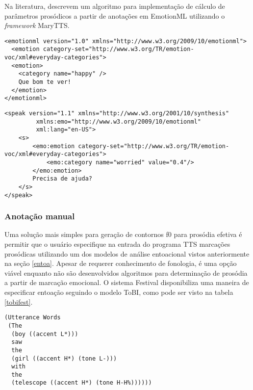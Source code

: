 Na literatura,  descrevem um algoritmo para implementação de
cálculo de parâmetros prosódicos a partir de anotações em EmotionML utilizando o
\emph{framework} MaryTTS.

% 


\begin{lstlisting}[caption=Exemplo de texto anotado com EmotionML com parâmetros
  discretos, label=lst:discreto]
<emotionml version="1.0" xmlns="http://www.w3.org/2009/10/emotionml">
  <emotion category-set="http://www.w3.org/TR/emotion-voc/xml#everyday-categories">
  <emotion>
    <category name="happy" />
    Que bom te ver!
  </emotion>
</emotionml>
\end{lstlisting}

\begin{lstlisting}[caption=Exemplo de texto anotado com SSML e EmotionML
  (adaptado de \cite{emotionml}), label=lst:ssmlemotion]
<speak version="1.1" xmlns="http://www.w3.org/2001/10/synthesis"
         xmlns:emo="http://www.w3.org/2009/10/emotionml"
         xml:lang="en-US">
    <s>
        <emo:emotion category-set="http://www.w3.org/TR/emotion-voc/xml#everyday-categories">
            <emo:category name="worried" value="0.4"/>
        </emo:emotion>
        Precisa de ajuda?
    </s>
</speak>
\end{lstlisting}


\subsubsection{Anotação manual}
Uma solução mais simples para geração de contornos f0 para prosódia efetiva é
permitir que o usuário especifique na entrada do programa TTS marcações
prosódicas utilizando um dos modelos de análise entoacional vistos
anteriormente na seção \ref{entoa}. Apesar de requerer conhecimento de fonologia, é uma opção 
viável enquanto não são desenvolvidos algoritmos para determinação de prosódia a
partir de marcação emocional. O sistema Festival \cite{festival} disponibiliza
uma maneira de especificar entoação seguindo o modelo ToBI, como pode ser visto
na tabela
\ref{tobifest}.

\begin{lstlisting}[caption=Anotações no modelo ToBI para o sistema TTS Festival,
  label=tobifest]
(Utterance Words 
 (The
  (boy ((accent L*)))
  saw
  the
  (girl ((accent H*) (tone L-)))
  with 
  the
  (telescope ((accent H*) (tone H-H%))))))
\end{lstlisting}
